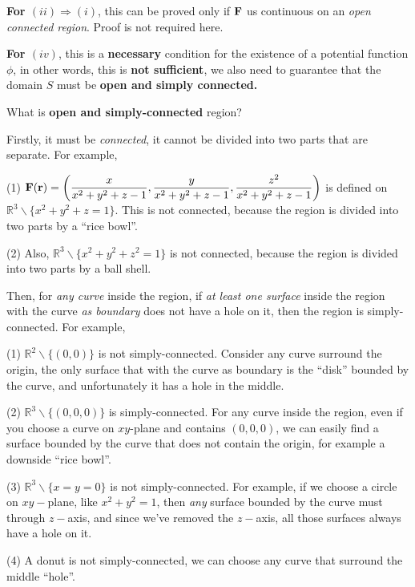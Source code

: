 \documentclass[11pt, a4paper]{MATH2023}
\newcommand{\rr}{{\bf r}}
\newcommand{\FF}{{\bf F}}
\begin{document}
\begin{spacing}{1.3}
    \vspace{0.2in}
    {\bf For $(ii)\Rightarrow (i)$}, this can be proved only if $\FF$ us continuous on an {\it open connected region}.
    Proof is not required here.

    {\bf For $(iv)$}, this is a {\bf necessary} condition for the existence of a potential function $\phi$,
    in other words, this is {\bf not sufficient}, we also need to guarantee that the domain $S$ 
    must be {\bf open and simply connected.}

    \vspace{0.3in}
    What is {\bf open and simply-connected} region?

    Firstly, it must be {\it connected}, it cannot be divided into two parts that are separate. For example,

    (1) $\disp \FF(\rr)=\left(\frac{x}{x^2+y^2+z-1}, \frac{y}{x^2+y^2+z-1}, \frac{z^2}{x^2+y^2+z-1}\right)$
    is defined on $\mathbb{R}^3\backslash \{x^2+y^2+z=1\}$. This is not connected, because the region 
    is divided into two parts by a ``rice bowl''.

    (2) Also, $\mathbb{R}^3\backslash \{x^2+y^2+z^2=1\}$ is not connected, because the region 
    is divided into two parts by a ball shell.

    Then, for {\it any curve} inside the region, if {\it at least one surface} inside the region
    with the curve {\it as boundary}
    does not have a hole on it, then the region is simply-connected. For example,

    (1) $\mathbb{R}^2\backslash \{(0,0)\}$ is not simply-connected. Consider any curve surround the origin,
    the only surface that with the curve as boundary is the ``disk'' bounded by the curve, and unfortunately 
    it has a hole in the middle.

    (2) $\mathbb{R}^3\backslash \{(0,0,0)\}$ is simply-connected. For any curve inside the region, even if 
    you choose a curve on $xy$-plane and contains $(0,0,0)$, we can easily find a surface bounded by the 
    curve that does not contain the origin, for example a downside ``rice bowl''.

    (3) $\mathbb{R}^3\backslash \{x=y=0\}$ is not simply-connected. For example, if we choose a circle on 
    $xy-$plane, like $x^2+y^2=1$, then {\it any} surface bounded by the curve must through $z-$axis,
    and since we've removed the $z-$axis, all those surfaces always have a hole on it.

    (4) A donut is not simply-connected, we can choose any curve that surround the middle ``hole''.



\end{spacing}
\end{document}
